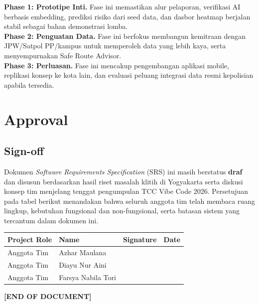 \documentclass[11pt,a4paper]{article}
\begin{document}
\noindent \textbf{Phase 1: Prototipe Inti.} Fase ini memastikan alur pelaporan, verifikasi AI berbasis embedding, prediksi risiko dari seed data, dan dasbor heatmap berjalan stabil sebagai bahan demonstrasi lomba.\\
\textbf{Phase 2: Penguatan Data.} Fase ini berfokus membangun kemitraan dengan JPW/Satpol PP/kampus untuk memperoleh data yang lebih kaya, serta menyempurnakan Safe Route Advisor.\\
\textbf{Phase 3: Perluasan.} Fase ini mencakup pengembangan aplikasi mobile, replikasi konsep ke kota lain, dan evaluasi peluang integrasi data resmi kepolisian apabila tersedia.

\newpage

\section{Approval}
\subsection{Sign-off}
Dokumen \textit{Software Requirements Specification} (SRS) ini masih berstatus \textbf{draf} dan disusun berdasarkan hasil riset masalah klitih di Yogyakarta serta diskusi konsep tim menjelang tenggat pengumpulan TCC Vibe Code 2026. Persetujuan pada tabel berikut menandakan bahwa seluruh anggota tim telah membaca ruang lingkup, kebutuhan fungsional dan non-fungsional, serta batasan sistem yang tercantum dalam dokumen ini.

\begin{longtable}{|L{4.2cm}|L{3.2cm}|L{2.6cm}|L{1.8cm}|}
\hline
{}\textbf{Project Role} & \textbf{Name} & \textbf{Signature} & \textbf{Date} \\ \hline
Anggota Tim & Azhar Maulana & & \\ \hline
Anggota Tim & Diayu Nur Aini & & \\ \hline
Anggota Tim & Farsya Nabila Tori & & \\ \hline
\end{longtable}

\vfill
\begin{center}
\textbf{[END OF DOCUMENT]}
\end{center}

\newpage

\end{document}
